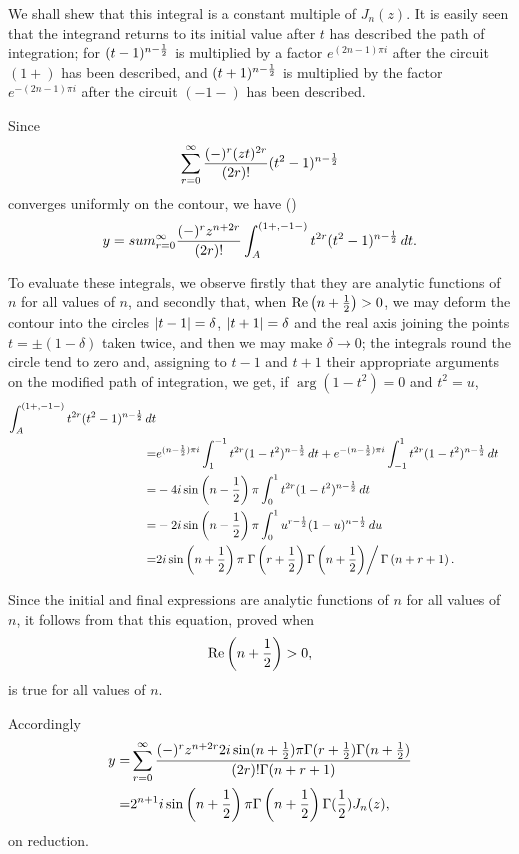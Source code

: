 \documentclass{book}
\begin{document}
We shall shew that this integral is a constant multiple of $J_n(z)$.
It is easily seen that the integrand returns to its initial value
after $t$ has described the path of integration; for
$(t-1)^{n-\frac{1}{2}}$ is multiplied by a factor
$e^{(2n-1)\pi i}$ after the circuit $(1+)$ has been described, and
$(t+1)^{n-\frac{1}{2}}$ is multiplied by the factor
$e^{-(2n-1)\pi i}$ after the circuit $(-1-)$ has been described.

Since
$$
\sum_{r=0}^{\infty}
\frac{(-)^r (zt)^{2r}}{(2r)!}
(t^2-1)^{n-\frac{1}{2}}
$$
converges uniformly on the contour, we have ()
$$
y
=
sum_{r=0}^{\infty}
\frac{(-)^r z^{n+2r}}{(2r)!}
\int_A^{(1+,-1-)}
t^{2r}
(t^2-1)^{n-\frac{1}{2}}
\, d t.
$$

To evaluate these integrals, we observe firstly that they are analytic
functions of $n$ for all values of $n$, and secondly that, when
$\mathrm{Re}\left( n+\frac{1}{2} \right) > 0$, we may deform the contour into the
circles $\left| t-1 \right|=\delta$, $\left| t+1 \right|=\delta$ and the real axis
joining the points $t = \pm (1-\delta)$ taken twice, and then we may
make $\delta \rightarrow 0$; the integrals round the circle tend to
zero and, assigning to $t-1$
%
%
and $t+1$ their appropriate arguments on the modified path of
integration, we get, if $\arg (1-t^2) = 0$ and $t^2 = u$,
\begin{align*}
  \int_A^{(1+,-1-)}
  t^{2r} (t^2-1)^{n-\frac{1}{2}} \, d t
  \\
  =&
  e^{(n-\frac{1}{2}) \pi i}
  \int_1^{-1} t^{2r} (1-t^2)^{n-\frac{1}{2}} \, d t
  + e^{-(n-\frac{1}{2}) \pi i}
  \int_{-1}^1 t^{2r} (1-t^2)^{n-\frac{1}{2}} \, d t
  \\
  =&
  -4i
  \sin\left( n-\frac{1}{2} \right) 
  \pi
  \int_0^1 t^{2r} (1-t^2)^{n-\frac{1}{2}} \, d t
  \\
  =&
  -2i \sin\left( n-\frac{1}{2} \right)
  \pi
  \int_0^1 u^{r-\frac{1}{2}} (1-u)^{n-\frac{1}{2}} \, d u
  \\
  =&
  2i \sin\left(  n + \frac{1}{2}  \right)
  \pi
  \left.
    \Gamma \left( r + \frac{1}{2} \right)
    \Gamma \left(  n + \frac{1}{2}   \right)
  \right/
  \Gamma \left(  n + r + 1   \right).
\end{align*}

Since the initial and final expressions are analytic functions of $n$
for all values of $n$, it follows from  that this
equation, proved when
$$
\mathrm{Re} \left(  n + \frac{1}{2}  \right) > 0,
$$
is true for all values of $n$.

Accordingly
\begin{align*}
  y
  =&
  \sum_{r=0}^{\infty}
  \frac{(-)^r z^{n+2r} 2i \sin(n+\frac{1}{2}) \pi \Gamma(r+\frac{1}{2})
    \Gamma(n+\frac{1}{2})}{ (2r)! \Gamma(n+r+1)}
  \\
  =&
  2^{n+1}
  i
  \sin\left( n+\frac{1}{2} \right)
  \pi
  \Gamma\left( n+\frac{1}{2} \right)
  \Gamma(\frac{1}{2})
  J_n(z),
\end{align*}
on reduction.
\end{document}
